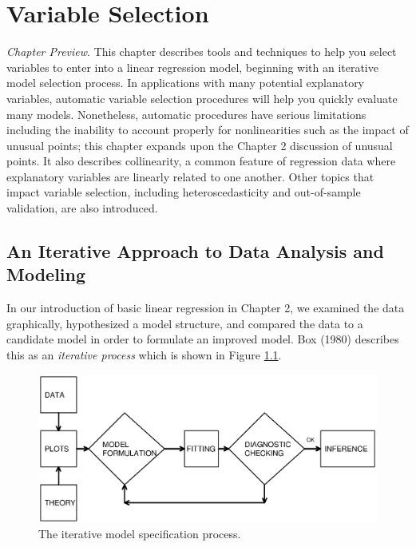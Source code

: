 \setcounter{chapter}{4}

\chapter{Variable Selection}

{\small \textit{Chapter Preview}. This chapter describes tools and
techniques to help you select variables to enter into a linear
regression model, beginning with an iterative model selection
process. In applications with many potential explanatory variables,
automatic variable selection procedures will help you quickly
evaluate many models. Nonetheless, automatic procedures have serious
limitations including the inability to account properly for
nonlinearities such as the impact of unusual points; this chapter
expands upon the Chapter 2 discussion of unusual points. It also
describes collinearity, a common feature of regression data where
explanatory variables are linearly related to one another. Other
topics that impact variable selection, including heteroscedasticity
and out-of-sample validation, are also introduced.}

\section{An Iterative Approach to Data Analysis and
Modeling}\label{S5:Iterative}

In our introduction of basic linear regression in Chapter 2, we
examined the data graphically, hypothesized a model structure, and
compared the data to a candidate model in order to formulate an
improved model. Box (1980) describes this as an \emph{iterative
process} which is shown in Figure \ref{F5:Iterative}.


\begin{figure}[htp]
    \includegraphics[width=1\textwidth]{Chapter5/F5Iterative.eps}
   \caption{\label{F5:Iterative} \small The iterative model specification process.}
\end{figure}

